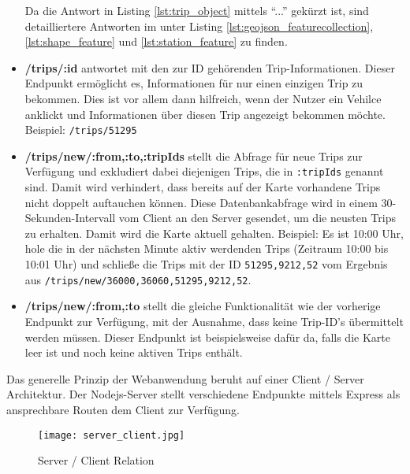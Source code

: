 \begin{itemize}
      Da die Antwort in Listing \ref{lst:trip_object} mittels "`..."' gekürzt ist, sind detailliertere Antworten im  unter Listing \ref{lst:geojson_featurecollection}, \ref{lst:shape_feature} und \ref{lst:station_feature} zu finden.

      \item \textbf{/trips/:id} antwortet mit den zur ID gehörenden Trip-Informationen. Dieser Endpunkt ermöglicht es, Informationen für nur einen einzigen Trip zu bekommen. Dies ist vor allem dann hilfreich, wenn der Nutzer ein Vehilce anklickt und Informationen über diesen Trip angezeigt bekommen möchte. Beispiel: \texttt{/trips/51295}

      \item \textbf{/trips/new/:from,:to,:tripIds} stellt die Abfrage für neue Trips zur Verfügung und exkludiert dabei diejenigen Trips, die in \texttt{:tripIds} genannt sind. Damit wird verhindert, dass bereits auf der Karte vorhandene Trips nicht doppelt auftauchen können. Diese Datenbankabfrage wird in einem 30-Sekunden-Intervall vom Client an den Server gesendet, um die neusten Trips zu erhalten. Damit wird die Karte aktuell gehalten. Beispiel: Es ist 10:00 Uhr, hole die in der nächsten Minute aktiv werdenden Trips (Zeitraum 10:00 bis 10:01 Uhr) und schließe die Trips mit der ID \texttt{51295,9212,52} vom Ergebnis aus \texttt{/trips/new/36000,36060,51295,9212,52}.

      \item \textbf{/trips/new/:from,:to} stellt die gleiche Funktionalität wie der vorherige Endpunkt zur Verfügung, mit der Ausnahme, dass keine Trip-ID's übermittelt werden müssen. Dieser Endpunkt ist beispielsweise dafür da, falls die Karte leer ist und noch keine aktiven Trips enthält.

    \end{itemize}


  Das generelle Prinzip der Webanwendung beruht auf einer Client / Server Architektur. Der Nodejs-Server stellt verschiedene Endpunkte mittels Express als ansprechbare Routen dem Client zur Verfügung. 

  \begin{figure}[htbp]
    \begin{center}
      \texttt{[image: server\_client.jpg]}
      \caption{Server / Client Relation}
      \label{fig:server_client}
    \end{center}
  \end{figure}

